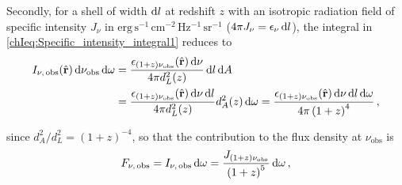 Secondly, for a shell of width $\dif l$ at redshift $z$ with an isotropic radiation field of specific intensity $J_\nu$ in $\mathrm{erg \, s^{-1} \, cm^{-2} \, Hz^{-1} \, sr^{-1}}$ ($4 \pi J_\nu = \epsilon_\nu \dif l$), the integral in \cref{chIeq:Specific_intensity_integral1} reduces to
\begin{align}
    \label{chIeq:Specific_intensity_integral3}
    I_{\nu, \, \text{obs}} (\hat{\mathbf{r}}) \dif \nu_\text{obs} \dif \omega & = \frac{\epsilon_{(1 + z) \nu_\text{obs}} (\hat{\mathbf{r}}) \dif \nu}{4 \pi d_L^2(z)} \dif l \dif A \nonumber
    \\
    & = \frac{\epsilon_{(1 + z) \nu_\text{obs}} (\hat{\mathbf{r}}) \dif \nu \dif l}{4 \pi d_L^2(z)} d_A^2(z) \dif \omega = \frac{\epsilon_{(1 + z) \nu_\text{obs}} (\hat{\mathbf{r}}) \dif \nu \dif l \dif \omega}{4 \pi \left( 1 + z \right)^4} \, ,
\end{align}

\noindent since $d_A^2/d_L^2 = (1+z)^{-4}$, so that the contribution to the flux density at $\nu_\text{obs}$ is
\begin{equation}
    \label{chIeq:Flux_density1}
    F_{\nu, \, \text{obs}} = I_{\nu, \, \text{obs}} \dif \omega = \frac{J_{(1 + z) \nu_\text{obs}}}{\left( 1 + z \right)^5} \dif \omega \, ,
\end{equation}

